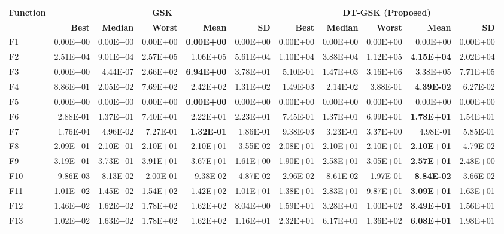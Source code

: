 \zebra
\begin{tabular}{lrrrrrrrrrr}
\toprule
\textbf{Function} & \multicolumn{5}{c}{\textbf{GSK}} & \multicolumn{5}{c}{\textbf{DT-GSK (Proposed)}} \\
\cmidrule(lr){2-6} \cmidrule(lr){7-11}
 & \textbf{Best} & \textbf{Median} & \textbf{Worst} & \textbf{Mean} & \textbf{SD} & \textbf{Best} & \textbf{Median} & \textbf{Worst} & \textbf{Mean} & \textbf{SD} \\
\midrule
F1 & 0.00E+00 & 0.00E+00 & 0.00E+00 & \textbf{0.00E+00} & 0.00E+00 & 0.00E+00 & 0.00E+00 & 0.00E+00 & 0.00E+00 & 0.00E+00 \\
F2 & 2.51E+04 & 9.01E+04 & 2.57E+05 & 1.06E+05 & 5.61E+04 & 1.10E+04 & 3.88E+04 & 1.12E+05 & \textbf{4.15E+04} & 2.02E+04 \\
F3 & 0.00E+00 & 4.44E-07 & 2.66E+02 & \textbf{6.94E+00} & 3.78E+01 & 5.10E-01 & 1.47E+03 & 3.16E+06 & 3.38E+05 & 7.71E+05 \\
F4 & 8.86E+01 & 2.05E+02 & 7.69E+02 & 2.42E+02 & 1.31E+02 & 1.49E-03 & 2.14E-02 & 3.88E-01 & \textbf{4.39E-02} & 6.27E-02 \\
F5 & 0.00E+00 & 0.00E+00 & 0.00E+00 & \textbf{0.00E+00} & 0.00E+00 & 0.00E+00 & 0.00E+00 & 0.00E+00 & 0.00E+00 & 0.00E+00 \\
F6 & 2.88E-01 & 1.37E+01 & 7.40E+01 & 2.22E+01 & 2.23E+01 & 7.45E-01 & 1.37E+01 & 6.99E+01 & \textbf{1.78E+01} & 1.54E+01 \\
F7 & 1.76E-04 & 4.96E-02 & 7.27E-01 & \textbf{1.32E-01} & 1.86E-01 & 9.38E-03 & 3.23E-01 & 3.37E+00 & 4.98E-01 & 5.85E-01 \\
F8 & 2.09E+01 & 2.10E+01 & 2.10E+01 & 2.10E+01 & 3.55E-02 & 2.08E+01 & 2.10E+01 & 2.10E+01 & \textbf{2.10E+01} & 4.79E-02 \\
F9 & 3.19E+01 & 3.73E+01 & 3.91E+01 & 3.67E+01 & 1.61E+00 & 1.90E+01 & 2.58E+01 & 3.05E+01 & \textbf{2.57E+01} & 2.48E+00 \\
F10 & 9.86E-03 & 8.13E-02 & 2.00E-01 & 9.38E-02 & 4.87E-02 & 2.96E-02 & 8.61E-02 & 1.97E-01 & \textbf{8.84E-02} & 3.66E-02 \\
F11 & 1.01E+02 & 1.45E+02 & 1.54E+02 & 1.42E+02 & 1.01E+01 & 1.38E+01 & 2.83E+01 & 9.87E+01 & \textbf{3.09E+01} & 1.63E+01 \\
F12 & 1.46E+02 & 1.62E+02 & 1.78E+02 & 1.62E+02 & 8.04E+00 & 1.59E+01 & 3.28E+01 & 1.00E+02 & \textbf{3.49E+01} & 1.56E+01 \\
F13 & 1.02E+02 & 1.63E+02 & 1.78E+02 & 1.62E+02 & 1.16E+01 & 2.32E+01 & 6.17E+01 & 1.36E+02 & \textbf{6.08E+01} & 1.98E+01 \\

\end{tabular}
